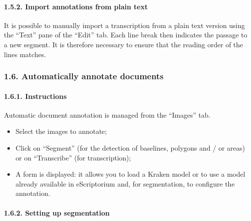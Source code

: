 \documentclass[
]{book}
\begin{document}
\hypertarget{import-annotations-from-plain-text}{%
\paragraph{1.5.2. Import annotations from plain text}\label{import-annotations-from-plain-text}}

It is possible to manually import a transcription from a plain text
version using the ``Text'' pane of the ``Edit'' tab. Each line break then
indicates the passage to a new segment. It is therefore necessary to
ensure that the reading order of the lines matches.

\hypertarget{automatically-annotate-documents}{%
\subsubsection{1.6. Automatically annotate documents}\label{automatically-annotate-documents}}

\hypertarget{instructions-1}{%
\paragraph{1.6.1. Instructions}\label{instructions-1}}

Automatic document annotation is managed from the ``Images'' tab.

\begin{itemize}
\item
  Select the images to annotate;
\item
  Click on ``Segment'' (for the detection of baselines, polygons and /
  or areas) or on ``Transcribe'' (for transcription);
\item
  A form is displayed: it allows you to load a Kraken model or to use
  a model already available in eScriptorium and, for segmentation, to
  configure the annotation.
\end{itemize}

\hypertarget{setting-up-segmentation}{%
\paragraph{1.6.2. Setting up segmentation}\label{setting-up-segmentation}}
\end{document}
